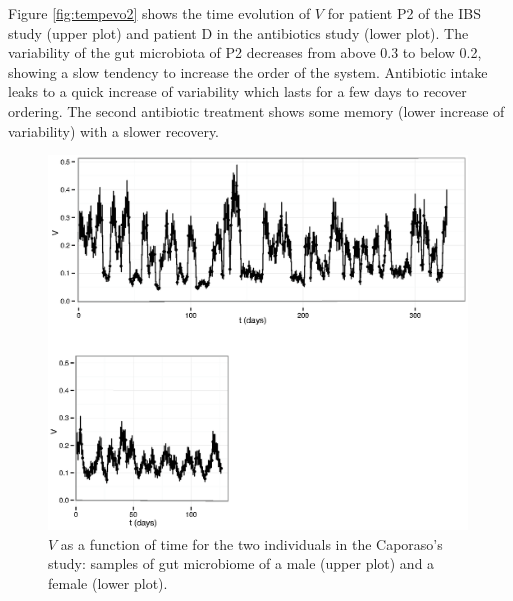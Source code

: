 Figure \ref{fig:tempevo2} shows the time evolution of $V$ for patient P2 of the IBS study\cite{IBS} (upper plot) and patient D in the antibiotics study\cite{antibiotic} (lower plot). The variability of the gut microbiota of P2 decreases from above 0.3 to below 0.2, showing a slow tendency to increase the order of the system.  Antibiotic intake leaks to a quick increase of variability which lasts for a few days to recover ordering. The second antibiotic treatment shows some memory (lower increase of variability) with a slower recovery.

\begin{figure}
	\includegraphics[width=0.99\textwidth]{figs/Fig6.eps}
\caption{$V$ as a function of time for the two individuals in the Caporaso's study\cite{moving}: samples of gut microbiome of a male (upper plot) and a female (lower plot).}
\label{fig:tempevo1}
\end{figure}

